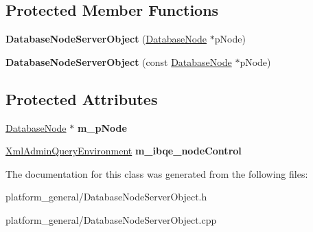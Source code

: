 \subsection*{\-Protected \-Member \-Functions}
\begin{DoxyCompactItemize}
\item 
\hypertarget{classgeneral__server_1_1DatabaseNodeServerObject_a648c8a2880bd8cd010f2513ea72e6d1e}{{\bfseries \-Database\-Node\-Server\-Object} (\hyperlink{classgeneral__server_1_1DatabaseNode}{\-Database\-Node} $\ast$p\-Node)}\label{classgeneral__server_1_1DatabaseNodeServerObject_a648c8a2880bd8cd010f2513ea72e6d1e}

\item 
\hypertarget{classgeneral__server_1_1DatabaseNodeServerObject_a9df6bc78ca1976540dec9aea8ced3a9c}{{\bfseries \-Database\-Node\-Server\-Object} (const \hyperlink{classgeneral__server_1_1DatabaseNode}{\-Database\-Node} $\ast$p\-Node)}\label{classgeneral__server_1_1DatabaseNodeServerObject_a9df6bc78ca1976540dec9aea8ced3a9c}

\end{DoxyCompactItemize}
\subsection*{\-Protected \-Attributes}
\begin{DoxyCompactItemize}
\item 
\hypertarget{classgeneral__server_1_1DatabaseNodeServerObject_a5b3b2ff4333aebbab70b99020de3ae62}{\hyperlink{classgeneral__server_1_1DatabaseNode}{\-Database\-Node} $\ast$ {\bfseries m\-\_\-p\-Node}}\label{classgeneral__server_1_1DatabaseNodeServerObject_a5b3b2ff4333aebbab70b99020de3ae62}

\item 
\hypertarget{classgeneral__server_1_1DatabaseNodeServerObject_a8be85f413f301486b59f0a3c7828f246}{\hyperlink{classgeneral__server_1_1XmlAdminQueryEnvironment}{\-Xml\-Admin\-Query\-Environment} {\bfseries m\-\_\-ibqe\-\_\-node\-Control}}\label{classgeneral__server_1_1DatabaseNodeServerObject_a8be85f413f301486b59f0a3c7828f246}

\end{DoxyCompactItemize}


\-The documentation for this class was generated from the following files\-:\begin{DoxyCompactItemize}
\item 
platform\-\_\-general/\-Database\-Node\-Server\-Object.\-h\item 
platform\-\_\-general/\-Database\-Node\-Server\-Object.\-cpp\end{DoxyCompactItemize}

